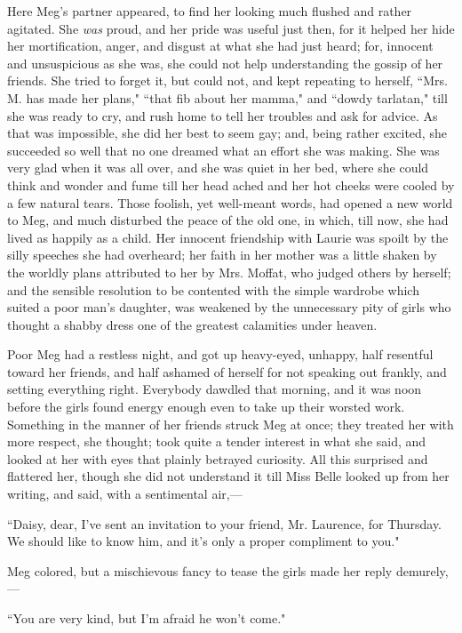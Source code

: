 Here Meg's partner appeared, to find her looking much
flushed and rather agitated. She \emph{was} proud, and her pride was
useful just then, for it helped her hide her mortification, anger, and
disgust at what she had just heard; for, innocent and unsuspicious as
she was, she could not help understanding the gossip of her friends. She
tried to forget it, but could not, and kept repeating to herself, ``Mrs.
M. has made her plans," ``that fib about her mamma," and ``dowdy
tarlatan," till she was ready to cry, and rush home to tell her troubles
and ask for advice. As that was impossible, she did her best to seem
gay; and, being rather excited, she succeeded so well that no one
dreamed what an effort she was making. She was very glad when it was all
over, and she was quiet in her bed, where she could think and wonder and
fume till her head ached and her hot cheeks were cooled by a few natural
tears. Those foolish, yet well-meant words, had opened a new world to
Meg, and much disturbed the peace of the old one, in which, till now,
she had lived as happily as a child. Her innocent friendship with Laurie
was spoilt by the silly speeches she had overheard; her faith in her
mother was a little shaken by the worldly plans attributed to her by
Mrs. Moffat, who judged others by herself; and the sensible resolution
to be contented with the simple wardrobe which suited a poor
man's daughter, was weakened by the unnecessary pity of
girls who thought a shabby dress one of the greatest calamities under
heaven.

Poor Meg had a restless night, and got up heavy-eyed, unhappy, half
resentful toward her friends, and half ashamed of herself for not
speaking out frankly, and setting everything right. Everybody dawdled
that morning, and it was noon before the girls found energy enough even
to take up their worsted work. Something in the manner of her friends
struck Meg at once; they treated her with more respect, she thought;
took quite a tender interest in what she said, and looked at her with
eyes that plainly betrayed curiosity. All this surprised and flattered
her, though she did not understand it till Miss Belle looked up from her
writing, and said, with a sentimental air,---

``Daisy, dear, I've sent an invitation to your friend,
Mr. Laurence, for Thursday. We should like to know him, and
it's only a proper compliment to you."

Meg colored, but a mischievous fancy to tease the girls made her reply
demurely,---

``You are very kind, but I'm afraid he
won't come."

